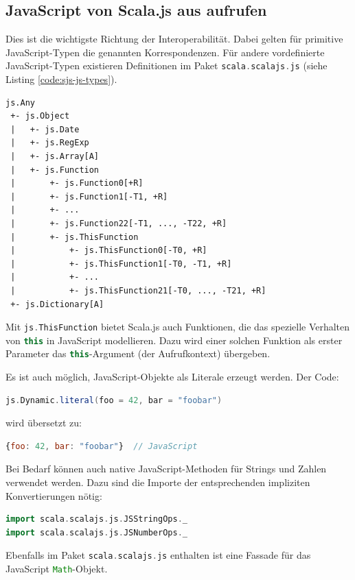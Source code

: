 \documentclass[a4paper, 12pt, hidelinks, listof=totoc, listoftables=totoc, bibliography=totoc]{scrreprt}
\newcommand{\scala}[1]{\lstinline[language=Scala, style=inline]|#1|}
\newcommand{\js}[1]{\lstinline[language=JavaScript, style=inline]|#1|}
\begin{document}
\medskip


\subsection{JavaScript von Scala.js aus aufrufen}

Dies ist die wichtigste Richtung der Interoperabilität. Dabei gelten für primitive JavaScript-Typen die genannten Korrespondenzen. Für andere vordefinierte JavaScript-Typen existieren Definitionen im Paket \scala{scala.scalajs.js} (siehe Listing \ref{code:sjs-js-types}).

\begin{lstlisting}[caption={Scala.js-Typhierarchie für vordefinierte JavaScript-Typen. (Quelle: \cite{scalajs.DCJ})}, label={code:sjs-js-types}]
js.Any
 +- js.Object
 |   +- js.Date
 |   +- js.RegExp
 |   +- js.Array[A]
 |   +- js.Function
 |       +- js.Function0[+R]
 |       +- js.Function1[-T1, +R]
 |       +- ...
 |       +- js.Function22[-T1, ..., -T22, +R]
 |       +- js.ThisFunction
 |           +- js.ThisFunction0[-T0, +R]
 |           +- js.ThisFunction1[-T0, -T1, +R]
 |           +- ...
 |           +- js.ThisFunction21[-T0, ..., -T21, +R]
 +- js.Dictionary[A]
\end{lstlisting}

Mit \scala{js.ThisFunction} bietet Scala.js auch Funktionen, die das spezielle Verhalten von \js{this} in JavaScript modellieren. Dazu wird einer solchen Funktion als erster Parameter das \js{this}-Argument (der Aufrufkontext) übergeben.

Es ist auch möglich, JavaScript-Objekte als Literale erzeugt werden. Der Code:
\begin{lstlisting}[language=Scala, style=snippet]
js.Dynamic.literal(foo = 42, bar = "foobar")
\end{lstlisting}
wird übersetzt zu:
\begin{lstlisting}[language=JavaScript, style=snippet]
{foo: 42, bar: "foobar"}  // JavaScript
\end{lstlisting}

Bei Bedarf können auch native JavaScript-Methoden für Strings und Zahlen verwendet werden. Dazu sind die Importe der entsprechenden impliziten Konvertierungen nötig:
\begin{lstlisting}[language=Scala, style=snippet]
import scala.scalajs.js.JSStringOps._
import scala.scalajs.js.JSNumberOps._
\end{lstlisting}

Ebenfalls im Paket \scala{scala.scalajs.js} enthalten ist eine Fassade für das JavaScript \js{Math}-Objekt.
\end{document}
